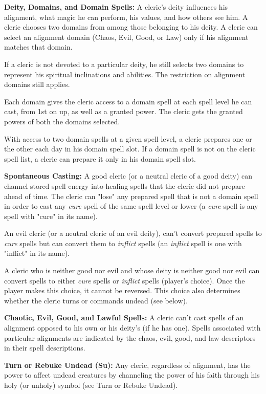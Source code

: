 \textbf{Deity, Domains, and Domain Spells:} A cleric's deity influences his alignment, 
what magic he can perform, his values, and how others see him. A cleric chooses 
two domains from among those belonging to his deity. A cleric can select an alignment 
domain (Chaos, Evil, Good, or Law) only if his alignment matches that domain.

If a cleric is not devoted to a particular deity, he still selects two domains 
to represent his spiritual inclinations and abilities. The restriction on alignment 
domains still applies.

Each domain gives the cleric access to a domain spell at each spell level he can 
cast, from 1st on up, as well as a granted power. The cleric gets the granted powers 
of both the domains selected.

With access to two domain spells at a given spell level, a cleric prepares one 
or the other each day in his domain spell slot. If a domain spell is not on the 
cleric spell list, a cleric can prepare it only in his domain spell slot.

\textbf{Spontaneous Casting:} A good cleric (or a neutral cleric of a good deity) 
can channel stored spell energy into healing spells that the cleric did not prepare 
ahead of time. The cleric can "lose" any prepared spell that is not a domain 
spell in order to cast any \textit{cure} spell of the same spell level or lower 
(a \textit{cure} spell is any spell with "cure" in its name). 

An evil cleric (or a neutral cleric of an evil deity), can't convert prepared spells 
to \textit{cure} spells but can convert them to \textit{inflict} spells (an \textit{inflict}
spell is one with "inflict" in its name).

A cleric who is neither good nor evil and whose deity is neither good nor evil 
can convert spells to either \textit{cure} spells or \textit{inflict} spells (player's 
choice). Once the player makes this choice, it cannot be reversed. This choice 
also determines whether the cleric turns or commands undead (see below).

\textbf{Chaotic, Evil, Good, and Lawful Spells:} A cleric can't cast spells of 
an alignment opposed to his own or his deity's (if he has one). Spells associated 
with particular alignments are indicated by the chaos, evil, good, and law descriptors 
in their spell descriptions.

\textbf{Turn or Rebuke Undead (Su):} Any cleric, regardless of alignment, has the 
power to affect undead creatures by channeling the power of his faith through his 
holy (or unholy) symbol (see Turn or Rebuke Undead).

